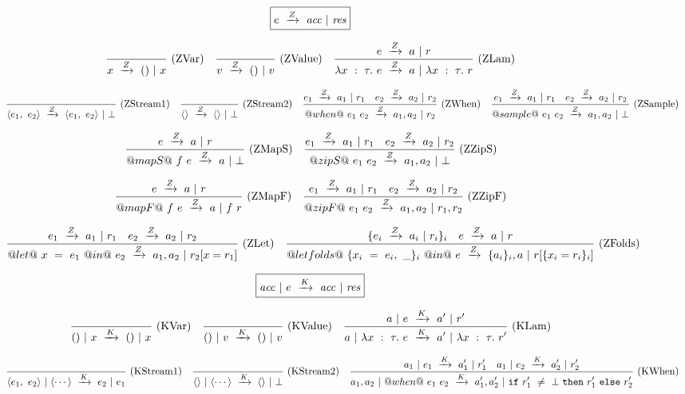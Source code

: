
\begin{figure*}

$$
\boxed{\SourceStepZ{e}{\mi{acc}}{\mi{res}}}
$$

$$
\ruleAx
{
    \SourceStepZ{x}{()}{x}
}{ZVar}
\ruleAx
{
    \SourceStepZ{v}{()}{v}
}{ZValue}
\ruleIN
{
    \SourceStepZ{e}{a}{r}
}
{
    \SourceStepZ{\lambda{}x~:~\tau.~e}{a}{\lambda{}x~:~\tau.~r}
}{ZLam}
$$

$$
\ruleAx
{
    \SourceStepZ{\langle e_1,~e_2 \rangle}{\langle e_1,~e_2 \rangle}{\bot}
}{ZStream1}
\ruleAx
{
    \SourceStepZ{\langle \rangle}{\langle \rangle}{\bot}
}{ZStream2}
\ruleIN
{
    \SourceStepZ{e_1}{a_1}{r_1}
    \quad
    \SourceStepZ{e_2}{a_2}{r_2}
}
{
    \SourceStepZ{@when@~e_1~e_2}{a_1,a_2}{r_2}
}{ZWhen}
\ruleIN
{
    \SourceStepZ{e_1}{a_1}{r_1}
    \quad
    \SourceStepZ{e_2}{a_2}{r_2}
}
{
    \SourceStepZ{@sample@~e_1~e_2}{a_1,a_2}{\bot}
}{ZSample}
$$

$$
\ruleIN
{
    \SourceStepZ{e}{a}{r}
}
{
    \SourceStepZ{@mapS@~f~e}{a}{\bot}
}{ZMapS}
\ruleIN
{
    \SourceStepZ{e_1}{a_1}{r_1}
    \quad
    \SourceStepZ{e_2}{a_2}{r_2}
}
{
    \SourceStepZ{@zipS@~e_1~e_2}{a_1,a_2}{\bot}
}{ZZipS}
$$

$$
\ruleIN
{
    \SourceStepZ{e}{a}{r}
}
{
    \SourceStepZ{@mapF@~f~e}{a}{f~r}
}{ZMapF}
\ruleIN
{
    \SourceStepZ{e_1}{a_1}{r_1}
    \quad
    \SourceStepZ{e_2}{a_2}{r_2}
}
{
    \SourceStepZ{@zipF@~e_1~e_2}{a_1,a_2}{r_1,r_2}
}{ZZipF}
$$

$$
\ruleIN
{
    \SourceStepZ{e_1}{a_1}{r_1}
    \quad
    \SourceStepZ{e_2}{a_2}{r_2}
}
{
    \SourceStepZ{@let@~x~=~e_1~@in@~e_2}{a_1,a_2}{r_2[x=r_1]}
}{ZLet}
\ruleIN
{
    \{ \SourceStepZ{e_i}{a_i}{r_i} \}_i
    \quad
    \SourceStepZ{e}{a}{r}
}
{
    \SourceStepZ{@let folds@~\{x_i~=~e_i,~\_\}_i~@in@~e}{\{a_i\}_i,a}{r[\{x_i=r_i\}_i]}
}{ZFolds}
$$

$$
\boxed{\SourceStepK{\mi{acc}}{e}{\mi{acc}}{\mi{res}}}
$$


$$
\ruleAx
{
    \SourceStepK{()}{x}{()}{x}
}{KVar}
\ruleAx
{
    \SourceStepK{()}{v}{()}{v}
}{KValue}
\ruleIN
{
    \SourceStepK{a}{e}{a'}{r'}
}
{
    \SourceStepK{a}{\lambda{}x~:~\tau.~e}{a'}{\lambda{}x~:~\tau.~r'}
}{KLam}
$$

$$
\ruleAx
{
    \SourceStepK{\langle e_1,~e_2 \rangle}{\langle \cdots \rangle}{e_2}{e_1}
}{KStream1}
\ruleAx
{
    \SourceStepK{\langle \rangle}{\langle \cdots \rangle}{\langle\rangle}{\bot}
}{KStream2}
\ruleIN
{
    \SourceStepK{a_1}{e_1}{a_1'}{r_1'}
    \quad
    \SourceStepK{a_1}{e_2}{a_2'}{r_2'}
}
{
    \SourceStepK{a_1,a_2}{@when@~e_1~e_2}{a_1',a_2'}{\Ifnbot{r_1'}{r_1'}{r_2'}}
}{KWhen}
$$


\end{figure*}
